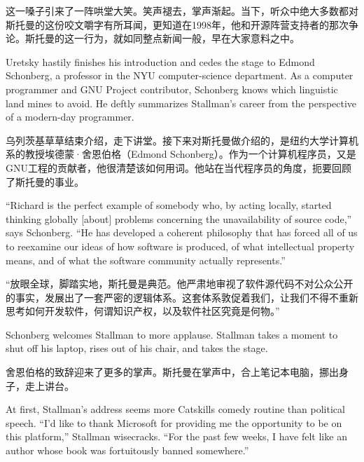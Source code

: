 \ifdefined\chs
这一嗓子引来了一阵哄堂大笑。笑声褪去，掌声渐起。当下，听众中绝大多数都对斯托曼的这份咬文嚼字有所耳闻，更知道在1998年，他和开源阵营支持者的那次争论。斯托曼的这一行为，就如同整点新闻一般，早在大家意料之中。
\fi

\ifdefined\eng
Uretsky hastily finishes his introduction and cedes the stage to Edmond Schonberg, a professor in the NYU computer-science department. As a computer programmer and GNU Project contributor, Schonberg knows which linguistic land mines to avoid. He deftly summarizes Stallman's career from the perspective of a modern-day programmer.
\fi

\ifdefined\chs
乌列茨基草草结束介绍，走下讲堂。接下来对斯托曼做介绍的，是纽约大学计算机系的教授埃德蒙·舍恩伯格（Edmond Schonberg）。作为一个计算机程序员，又是GNU工程的贡献者，他很清楚该如何用词。他站在当代程序员的角度，扼要回顾了斯托曼的事业。
\fi

\ifdefined\eng
``Richard is the perfect example of somebody who, by acting locally, started thinking globally [about] problems concerning the unavailability of source code,'' says Schonberg. ``He has developed a coherent philosophy that has forced all of us to reexamine our ideas of how software is produced, of what intellectual property means, and of what the software community actually represents.''\ifdefined\vtwo{}\fi
\fi

\ifdefined\chs
``放眼全球，脚踏实地，斯托曼是典范。他严肃地审视了软件源代码不对公众公开的事实，发展出了一套严密的逻辑体系。这套体系敦促着我们，让我们不得不重新思考如何开发软件，何谓知识产权，以及软件社区究竟是何物。''\ifdefined\vtwo{}\fi
\fi

\ifdefined\eng
Schonberg welcomes Stallman to more applause. Stallman takes a moment to shut off his laptop, rises out of his chair, and takes the stage.
\fi

\ifdefined\chs
舍恩伯格的致辞迎来了更多的掌声。斯托曼在掌声中，合上笔记本电脑，挪出身子，走上讲台。
\fi

\ifdefined\eng
At first, Stallman's address seems more Catskills comedy routine than political speech. ``I'd like to thank Microsoft for providing me the opportunity to be on this platform,'' Stallman wisecracks. ``For the past few weeks, I have felt like an author whose book was fortuitously banned somewhere.''
\fi

